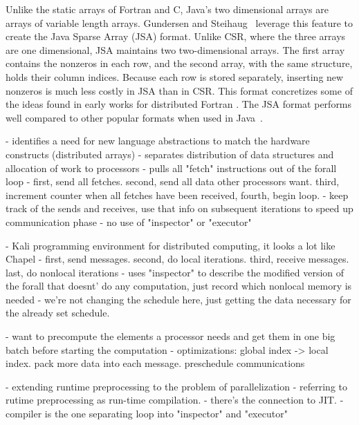 Unlike the static arrays of Fortran and C, Java's two dimensional arrays are arrays of variable length arrays. 
Gundersen and Steihaug~\cite{gundersen2004data} leverage this feature to create the Java Sparse Array (JSA) format.
Unlike CSR, where the three arrays are one dimensional, JSA maintains two two-dimensional arrays. 
The first array contains the nonzeros in each row, and the second array, with the same structure, holds their column indices. 
Because each row is stored separately, inserting new nonzeros is much less costly in JSA than in CSR. 
This format concretizes some of the ideas found in early works for distributed Fortran .
The JSA format performs well compared to other popular formats when used in Java~\cite{lujan2005storage}.


\cite{ashcraft1999spooles}





\cite{mehrotra1989compiling}
- identifies a need for new language abstractions to match the hardware constructs (distributed arrays)
- separates distribution of data structures and allocation of work to processors
- pulls all "fetch" instructions out of the forall loop
- first, send all fetches. second, send all data other processors want. third, increment counter when all fetches have been received, fourth, begin loop.
- keep track of the sends and receives, use that info on subsequent iterations to speed up communication phase
- no use of "inspector" or "executor"

\cite{koelbel1990supporting}
- Kali programming environment for distributed computing, it looks a lot like Chapel
- first, send messages. second, do local iterations. third, receive messages. last, do nonlocal iterations
- uses "inspector" to describe the modified version of the forall that doesnt' do any computation, just record which nonlocal memory is needed
- we're not changing the schedule here, just getting the data necessary for the already set schedule.


\cite{saltz1990run}
- want to precompute the elements a processor needs and get them in one big batch before starting the computation
- optimizations: global index -> local index. pack more data into each message. preschedule communications

\cite{saltz1991multiprocessors}
- extending runtime preprocessing to the problem of parallelization
- referring to rutime preprocessing as run-time compilation. 
- there's the connection to JIT.
- compiler is the one separating loop into "inspector" and "executor"


